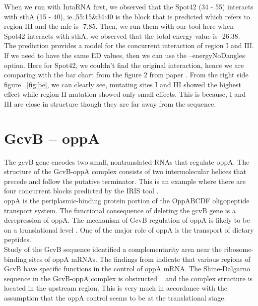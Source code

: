 \documentclass[twoside,a4paper]{report}
\numberwithin{equation}{section}
\begin{document}
When we run with IntaRNA first, we observed that the Spot42 (34 - 55) interacts with sthA (15 - 40), ie.,55:15\&34:40 is the block that is predicted which refers to region III and the mfe is -7.85. Then, we run them with our tool here when Spot42 interacts with sthA, we observed that the total energy value is -26.38. The prediction provides a model for the concurrent interaction of region I and III. If we need to have the same ED values, then we can use the --energyNoDangles option. Here for Spot42, we couldn't find the original interaction, hence we are comparing with the bar chart from the figure 2 from paper {\citep{beisel2011base}}. From the right side figure ~\ref{fig:be}, we can clearly see, mutating sites I and III showed the highest effect while region II mutation showed only small effects. This is because, I and III are close in structure though they are far away from the sequence.\\

\clearpage

	\section{GcvB – oppA }
    The gcvB gene encodes two small, nontranslated RNAs that regulate oppA. The structure of the GcvB-oppA complex consists of two intermolecular helices that precede and follow the putative terminator. This is an example where there are four concurrent blocks predicted by the IRIS tool {\citep{pervouchine2004iris}}. \\ 
    
     oppA is the periplasmic-binding protein portion of the OppABCDF oligopeptide transport system. The functional consequence of deleting the gcvB gene is a derepression of oppA. The mechanism of GcvB regulation of oppA is likely to be on a translational level \citep{urbanowski2000gcvb}. One of the major role of oppA is the transport of dietary peptides.\\
    
    Study of the GcvB sequence identified a complementarity area near the ribosome-binding sites of oppA mRNAs. The findings from {\citep{pulvermacher2008role}} indicate that various regions of GcvB have specific functions in the control of oppA mRNA. The Shine-Dalgarno sequence in the GcvB-oppA complex is obstructed ~\citep{pervouchine2004iris} and the complex structure is located in the upstream region. This is very much in accordance with the assumption that the oppA control seems to be at the translational stage. \\
    
\end{document}
